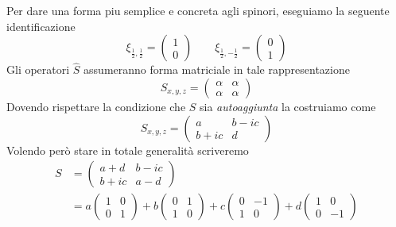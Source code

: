 Per dare una forma piu semplice e concreta agli spinori, eseguiamo la
seguente identificazione \[
                             \xi_{\frac{1}{2}, \frac{1}{2}} =
                             \begin{pmatrix}
                                 1 \\ 0
                             \end{pmatrix} \qquad
                             \xi_{\frac{1}{2}, - \frac{1}{2}} =
                             \begin{pmatrix}
                                 0 \\ 1
                             \end{pmatrix}
\] Gli operatori \(\hat{S}\) assumeranno forma matriciale in tale
rappresentazione \[
                     S_{x,y,z} =
                     \begin{pmatrix}
                         \alpha & \alpha \\
                         \alpha & \alpha
                     \end{pmatrix}
\] Dovendo rispettare la condizione che \(S\) sia \emph{autoaggiunta} la
costruiamo come \[
                    S_{x,y,z} =
                    \begin{pmatrix}
                        a      & b - ic \\
                        b + ic & d
                    \end{pmatrix}
\] Volendo però stare in totale generalità scriveremo
\begin{align*}
    S & =
    \begin{pmatrix}
        a + d & b-ic \\
        b+ic  & a-d
    \end{pmatrix} \\
    & =
    a
    \begin{pmatrix}
        1 & 0 \\
        0 & 1
    \end{pmatrix}
    + b \begin{pmatrix}
            0 & 1 \\
            1 & 0
    \end{pmatrix}
    + c \begin{pmatrix}
            0 & -1 \\
            1 & 0
    \end{pmatrix}
    +d \begin{pmatrix}
           1 & 0  \\
           0 & -1
    \end{pmatrix}
\end{align*}

